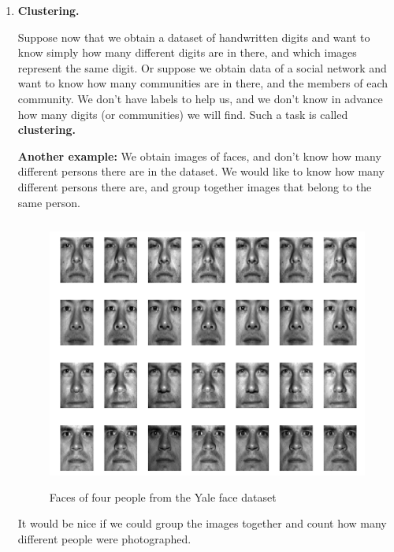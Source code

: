 \begin{enumerate}
  \item {\bf Clustering.}

    Suppose now that we obtain a dataset of handwritten digits and want to know
    simply how many different digits are in there, and which images represent
    the same digit. Or suppose we obtain data of a social network and want to
    know how many communities are in there, and the members of each community.
    We don't have labels to help us, and we don't know in advance how many
    digits (or communities) we will find. Such a task is called {\bf
    clustering.} 

    {\bf Another example:} We obtain images of faces, and don't know how many
    different persons there are in the dataset. We would like to know how many
    different persons there are, and group together images that belong to the
    same person. 
    
    \begin{figure}[H]
      \centering
      \includegraphics[height=3.5in]{pca_faces_before.jpeg}        
      \caption{Faces of four people from the Yale face dataset}
    \end{figure}

    It would be nice if we could group the images together and count how many
    different people were photographed. 


\end{enumerate}
